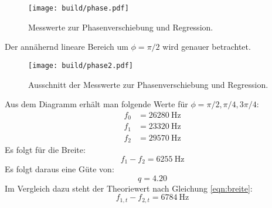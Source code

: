 \begin{figure}[H]
    \centering
    \caption{Messwerte zur Phasenverschiebung und Regression.}
    \label{fig:phase}
    \texttt{[image: build/phase.pdf]}
\end{figure}
\noindent
Der annähernd lineare Bereich um $\phi=\pi/2$ wird genauer betrachtet.
\begin{figure}[H]
    \centering
    \caption{Ausschnitt der Messwerte zur Phasenverschiebung und Regression.}
    \label{fig:phase2}
    \texttt{[image: build/phase2.pdf]}
\end{figure}
\noindent
Aus dem Diagramm erhält man folgende Werte für $\phi=\pi/2, \pi/4, 3\pi/4$:
\begin{align}
    f_0 &= \SI{26280}{\hertz} \\ 
    f_1 &= \SI{23320}{\hertz} \\ 
    f_2 &= \SI{29570}{\hertz}
\end{align}
Es folgt für die Breite:
\begin{equation}
    f_1-f_2 = \SI{6255}{\hertz}
\end{equation}
Es folgt daraus eine Güte von:
\begin{equation}
    q=4.20
\end{equation}
Im Vergleich dazu steht der Theoriewert nach Gleichung \eqref{eqn:breite}:
\begin{equation}
    f_{1,t}-f_{2,t} = \SI{6784}{\hertz}
\end{equation}
%

